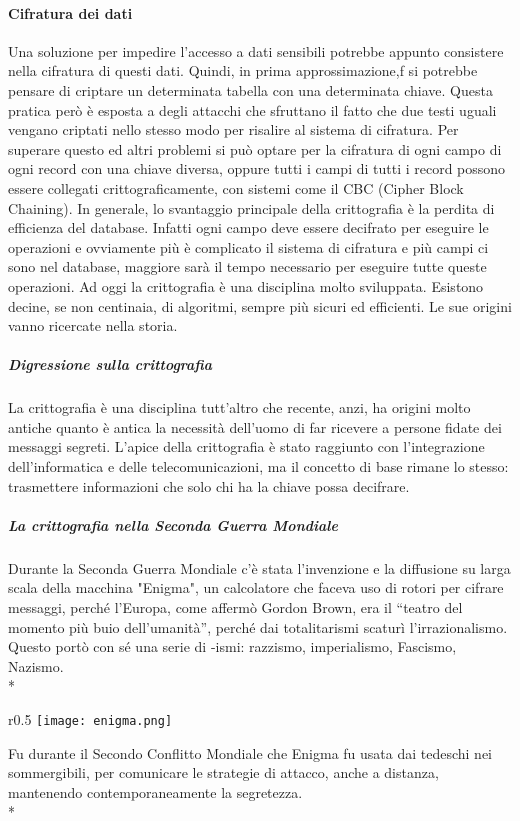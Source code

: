 \documentclass[12pt]{article}
\begin{document}
\bigskip
\paragraph{Cifratura dei dati}
Una soluzione per impedire l’accesso a dati sensibili potrebbe appunto consistere nella cifratura di questi dati. Quindi, in prima approssimazione,f si potrebbe pensare di criptare un determinata tabella con una determinata chiave. Questa pratica però è esposta a degli attacchi che sfruttano il fatto che due testi uguali vengano criptati nello stesso modo per risalire al sistema di cifratura.
Per superare questo ed altri problemi si può optare per la cifratura di ogni campo di ogni record con una chiave diversa, oppure tutti i campi di tutti i record possono essere collegati crittograficamente, con sistemi come il CBC (Cipher Block Chaining).
In generale, lo svantaggio principale della crittografia è la perdita di efficienza del database. Infatti ogni campo deve essere decifrato per eseguire le operazioni e ovviamente più è complicato il sistema di cifratura e più campi ci sono nel database, maggiore sarà il tempo necessario per eseguire tutte queste operazioni.
Ad oggi la crittografia è una disciplina molto sviluppata. Esistono decine, se non centinaia, di algoritmi, sempre più sicuri ed efficienti. Le sue origini vanno ricercate nella storia.

\bigskip
\subparagraph{Digressione sulla crittografia}
La crittografia è una disciplina tutt’altro che recente, anzi, ha origini molto antiche quanto è antica la necessità dell’uomo di far ricevere a persone fidate dei messaggi segreti. L’apice della crittografia è stato raggiunto con l'integrazione dell’informatica e delle telecomunicazioni, ma il concetto di base rimane lo stesso: trasmettere informazioni che solo chi ha la chiave possa decifrare. 

\bigskip
\subparagraph{La crittografia nella Seconda Guerra Mondiale}
Durante la Seconda Guerra Mondiale c’è stata l’invenzione  e la diffusione su larga scala della macchina "Enigma", un calcolatore che faceva uso di rotori per cifrare messaggi, perché l’Europa, come affermò Gordon Brown, era il “teatro del momento più buio dell’umanità”, perché dai totalitarismi scaturì l'irrazionalismo. Questo portò con sé una serie di -ismi: razzismo, imperialismo, Fascismo, Nazismo.\\*
\begin{wrapfigure}{r}{0.5\textwidth}
    \texttt{[image: enigma.png]}
\end{wrapfigure}
Fu durante il Secondo Conflitto Mondiale che Enigma fu usata dai tedeschi nei sommergibili, per comunicare le strategie di attacco, anche a  distanza, mantenendo contemporaneamente la segretezza.\\*
\end{document}
